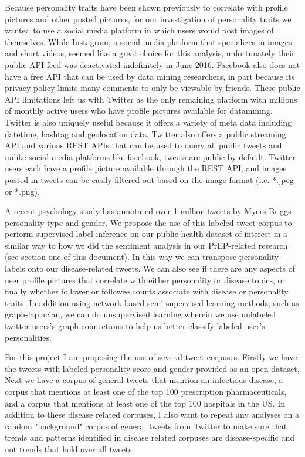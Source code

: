 Because personality traits have been shown previously to correlate with profile pictures and other posted pictures\cite{ong2011narcissism}, for our investigation of personality traits we wanted to use a social media platform in which users would post images of themselves. While Instagram, a social media platform that specializes in images and short videos, seemed like a great choice for this analysis, unfortunately their public API feed was deactivated indefinitely in June 2016. Facebook also does not have a free API that can be used by data mining researchers, in part because its privacy policy limits many comments to only be viewable by friends. These public API limitations left us with Twitter as the only remaining platform with millions of monthly active users who have profile pictures available for datamining. Twitter is also uniquely useful because it offers a variety of meta data including datetime, hashtag and geolocation data. Twitter also offers a public streaming API and various REST APIs that can be used to query all public tweets and unlike social media platforms like facebook, tweets are public by default. Twitter users each have a profile picture available through the REST API, and images posted in tweets can be easily filtered out based on the image format (i.e. *.jpeg or *.png).

A recent psychology study has annotated over 1 million tweets by Myers-Briggs personality type and gender\cite{plank2015personality}. We propose the use of this labeled tweet corpus to perform supervised label inference on our public health dataset of interest in a similar way to how we did the sentiment analysis in our PrEP-related research (see section one of this document). In this way we can transpose personality labels onto our disease-related tweets.  We can also see if there are any aspects of user profile pictures that correlate with either personality or disease topics, or finally whether follower or followee counts associate with disease or personality traits. In addition using network-based semi supervised learning methods, such as graph-laplacian\cite{sindhwani2005beyond}, we can do unsupervised learning wherein we use unlabeled twitter users's graph connections to help us better classify labeled user's personalities.

For this project I am proposing the use of several tweet corpuses. Firstly we have the tweets with labeled personality score and gender provided as an open dataset\cite{plank2015personality}. Next we have a corpus of general tweets that mention an infectious disease, a corpus that mentions at least one of the top 100 prescription pharmaceuticals, and a corpus that mentions at least one of the top 100 hospitals in the US. In addition to these disease related corpuses, I also want to repeat any analyses on a random "background" corpus of general tweets from Twitter to make sure that trends and patterns identified in disease related corpuses are disease-specific and not trends that hold over all tweets.


